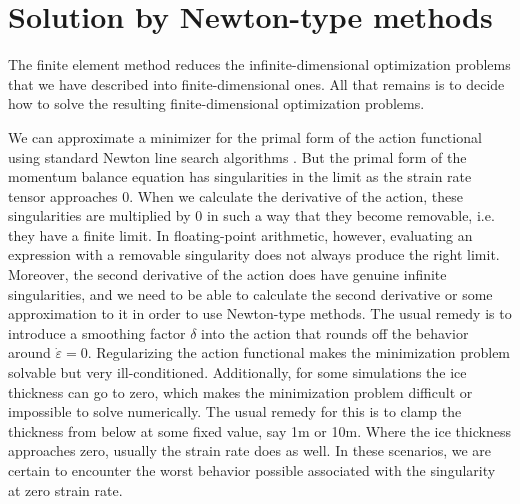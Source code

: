 \documentclass[twocolumn,letterpaper]{igs}
\begin{document}
\section{Solution by Newton-type methods}
\label{app:solution}

The finite element method reduces the infinite-dimensional optimization problems that we have described into finite-dimensional ones.
All that remains is to decide how to solve the resulting finite-dimensional optimization problems.

We can approximate a minimizer for the primal form of the action functional using standard Newton line search algorithms \citep{shapero2021icepack}.
But the primal form of the momentum balance equation has singularities in the limit as the strain rate tensor approaches 0.
When we calculate the derivative of the action, these singularities are multiplied by 0 in such a way that they become removable, i.e. they have a finite limit.
In floating-point arithmetic, however, evaluating an expression with a removable singularity does not always produce the right limit.
Moreover, the second derivative of the action does have genuine infinite singularities, and we need to be able to calculate the second derivative or some approximation to it in order to use Newton-type methods.
The usual remedy is to introduce a smoothing factor $\delta$ into the action that rounds off the behavior around $\dot\varepsilon = 0$.
Regularizing the action functional makes the minimization problem solvable but very ill-conditioned.
Additionally, for some simulations the ice thickness can go to zero, which makes the minimization problem difficult or impossible to solve numerically.
The usual remedy for this is to clamp the thickness from below at some fixed value, say 1m or 10m.
Where the ice thickness approaches zero, usually the strain rate does as well.
In these scenarios, we are certain to encounter the worst behavior possible associated with the singularity at zero strain rate.
\end{document}
